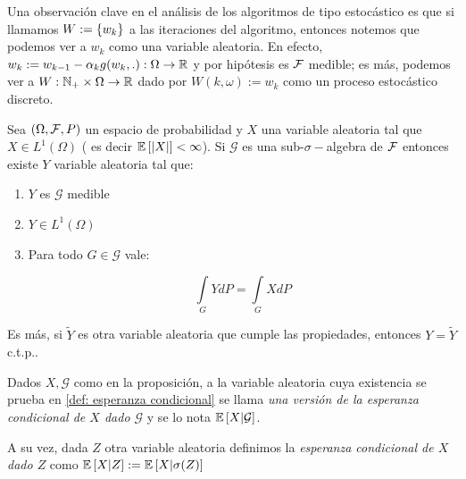 \begin{remark}
	Una observaci\'on clave en el an\'alisis de los algoritmos de tipo estoc\'astico es que si llamamos ${W} := \left\lbrace w_k\right\rbrace$ a las iteraciones del algoritmo, entonces notemos que podemos ver a $w_k$ como una variable aleatoria. En efecto, $w_k := w_{k-1} - \alpha_k g(w_k, .) : \Omega \rightarrow {\mathbb{R}}$ y por hip\'otesis es $\mathcal{F}$ medible; es m\'as, podemos ver a $W : {\mathbb{N}}_+ \times \Omega \rightarrow {\mathbb{R}}$ dado por $W(k, \omega) := w_k$ como un proceso estoc\'astico discreto.
\end{remark}

\begin{proposition}
	\label{def: esperanza condicional}
	Sea $\left(\Omega, \mathcal{F}, P\right)$ un espacio de probabilidad y $X$ una variable aleatoria tal que $X \in L^1(\Omega)$ ( es decir $\mathbb{E} \left[\left\lvert X\right\rvert\right] < \infty$). Si $\mathcal{G}$ es una sub-$\sigma-$algebra de $\mathcal{F}$ entonces existe $Y$ variable aleatoria tal que:
	
	\begin{enumerate}
		\item $Y$ es $\mathcal{G}$ medible
		\item $Y \in L^1(\Omega)$
		\item Para todo $G \in \mathcal{G}$ vale:
		
		\begin{equation*}
			\int\limits_{G} {Y dP} = \int\limits_{G} {X dP}
		\end{equation*}
	\end{enumerate}

	Es m\'as, si $\widetilde{Y}$ es otra variable aleatoria que cumple las propiedades, entonces $Y = \widetilde{Y}$ c.t.p..
	
\end{proposition}

\begin{definition}
	Dados $X,\mathcal{G}$ como en la proposici\'on, a la variable aleatoria cuya existencia se prueba en \ref{def: esperanza condicional} se llama \textit{una versi\'on de la esperanza condicional de $X$ dado $\mathcal{G}$} y se lo nota $\mathbb{E} \left[X \vert \mathcal{G}\right]$.
	
	A su vez, dada $Z$ otra variable aleatoria definimos la \textit{esperanza condicional de $X$ dado $Z$} como $\mathbb{E} \left[X \vert Z\right] := \mathbb{E} \left[X \vert \sigma(Z)\right]$
	
\end{definition}

